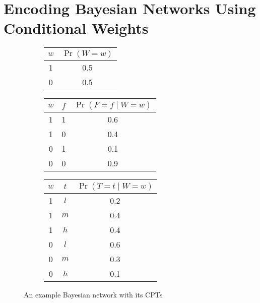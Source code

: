 \documentclass{article}
\theoremstyle{definition}
\theoremstyle{remark}
\begin{document}
{\section{Encoding Bayesian Networks Using Conditional Weights}

\begin{figure}
  \centering
  \begin{subfigure}{0.2\textwidth}
    \centering
  \end{subfigure}%
  \begin{subfigure}{0.8\textwidth}
    \centering
    \begin{tabular}[t]{cc}
      \toprule
      $w$ & $\Pr(W = w)$ \\
      \midrule
      1 & 0.5 \\
      0 & 0.5 \\
      \bottomrule
    \end{tabular}
    \begin{tabular}[t]{ccc}
      \toprule
      $w$ & $f$ & $\Pr(F = f \mid W = w)$ \\
      \midrule
      1 & 1 & 0.6 \\
      1 & 0 & 0.4 \\
      0 & 1 & 0.1 \\
      0 & 0 & 0.9 \\
      \bottomrule
    \end{tabular}
    \begin{tabular}[t]{ccc}
      \toprule
      $w$ & $t$ & $\Pr(T = t \mid W = w)$ \\
      \midrule
      1 & $l$ & 0.2 \\
      1 & $m$ & 0.4 \\
      1 & $h$ & 0.4 \\
      0 & $l$ & 0.6 \\
      0 & $m$ & 0.3 \\
      0 & $h$ & 0.1 \\
      \bottomrule
    \end{tabular}
  \end{subfigure}
  \caption{An example Bayesian network with its CPTs}
  \label{fig:example_bn}
\end{figure}

}
\end{document}
